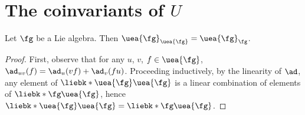 \documentclass{article}
\begin{document}
\section{The coinvariants of $U$}

\begin{lemma}\label{lem:coinvLieAlg}
        Let $\fg$ be a Lie algebra. Then $\uea{\fg}_{\uea{\fg}} =
        \uea{\fg}_\fg$.
\end{lemma}
\begin{proof}
First, observe that for any $u$, $v$, $f\in\uea{\fg}$,
$\ad_{uv}(f) = \ad_u(vf) + \ad_v(fu)$. Proceeding inductively, by the linearity
of $\ad$, any element of $\liebk*{\uea{\fg}}{\uea{\fg}}$ is a linear combination
of elements of $\liebk*{\fg}{\uea{\fg}}$, hence
$\liebk*{\uea{\fg}}{\uea{\fg}} = \liebk*{\fg}{\uea{\fg}}$.
\end{proof}
\end{document}
